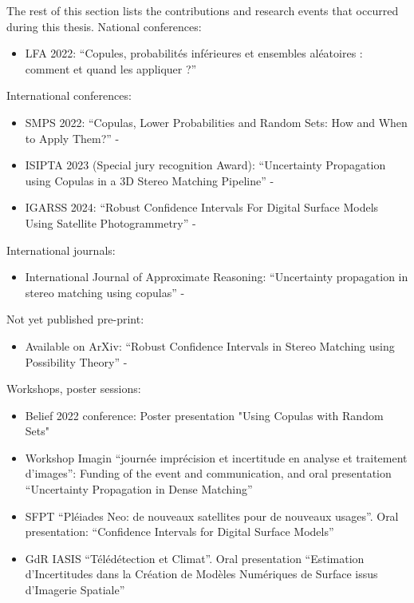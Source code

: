 The rest of this section lists the contributions and research events that occurred during this thesis.
\noindent National conferences:
\begin{itemize}
    \item LFA 2022: ``Copules, probabilités inférieures et ensembles aléatoires : comment et quand les appliquer ?''  \cite{malinowski_copules_2022}
\end{itemize}
International conferences:
\begin{itemize}
    \item SMPS 2022: ``Copulas, Lower Probabilities and Random Sets: How and When to Apply Them?'' - \cite{malinowski_copulas_2022}
    \item ISIPTA 2023 (Special jury recognition Award): ``Uncertainty Propagation using Copulas in a 3D Stereo Matching Pipeline'' -  \cite{malinowski_uncertainty_2023}
    \item IGARSS 2024: ``Robust Confidence Intervals For Digital Surface Models Using Satellite Photogrammetry'' -  \cite{malinowski_robust_2024}
\end{itemize}
International journals:
\begin{itemize}
    \item International Journal of Approximate Reasoning: ``Uncertainty propagation in stereo matching using copulas'' -  \cite{malinowski_uncertainty_2024}
\end{itemize}
Not yet published pre-print:
\begin{itemize}
    \item Available on ArXiv: ``Robust Confidence Intervals in Stereo Matching using Possibility Theory'' - \cite{malinowski_robust_2024-1}
\end{itemize}
Workshops, poster sessions:
\begin{itemize}
    \item Belief 2022 conference: Poster presentation "Using Copulas with Random Sets"
    \item Workshop Imagin ``journée imprécision et incertitude en analyse et traitement d'images'': Funding of the event and communication, and oral presentation ``Uncertainty Propagation in Dense Matching''
    \item SFPT ``Pléiades Neo: de nouveaux satellites pour de nouveaux usages''. Oral presentation: ``Confidence Intervals for Digital Surface Models''
    \item GdR IASIS ``Télédétection et Climat''. Oral presentation ``Estimation d'Incertitudes dans la Création de Modèles Numériques de Surface issus d'Imagerie Spatiale''
\end{itemize}

\pagebreak
